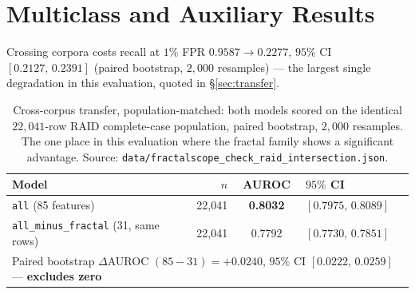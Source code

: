 \documentclass{article}
\newcommand{\arm}[1]{\texttt{#1}}
\begin{document}
\section{Multiclass and Auxiliary Results}
\label{app:multiclass}

Crossing corpora costs recall at $1\%$ FPR $0.9587\!\to\!0.2277$, $95\%$ CI
$[0.2127,\,0.2391]$ (paired bootstrap, $2{,}000$ resamples) --- the largest
single degradation in this evaluation, quoted in \S\ref{sec:transfer}.

\begin{table}[h]
\centering
\caption{Cross-corpus transfer, population-matched: both models scored on the
identical $22{,}041$-row RAID complete-case population, paired bootstrap, $2{,}000$
resamples. The one place in this evaluation where the fractal family shows a
significant advantage. Source: \texttt{data/fractalscope\_check\_raid\_intersection.json}.}
\label{tab:raid}
\footnotesize
\begin{tabular}{lrcl}
\toprule
Model & $n$ & AUROC & $95\%$ CI \\
\midrule
\arm{all} (85 features)                      & 22{,}041 & \textcolor{okBlue}{\textbf{0.8032}} & $[0.7975,\,0.8089]$ \\
\arm{all\_minus\_fractal} (31, same rows)    & 22{,}041 & 0.7792 & $[0.7730,\,0.7851]$ \\
\midrule
\multicolumn{4}{l}{Paired bootstrap $\Delta$AUROC $(85-31) = \mathbf{+0.0240}$, $95\%$ CI $[0.0222,\,0.0259]$ --- \textbf{excludes zero}}\\
\bottomrule
\end{tabular}
\end{table}
\end{document}
